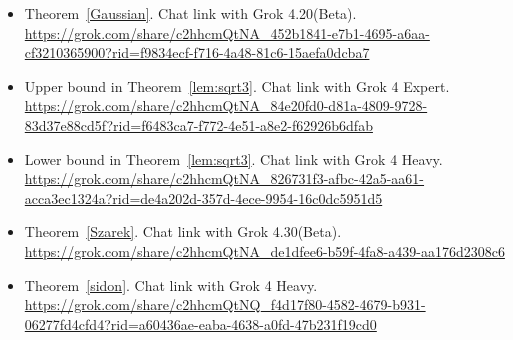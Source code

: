 \documentclass[11pt]{article}
\begin{document}
\begin{itemize}
    \item Theorem~\ref{Gaussian}. Chat link with Grok 4.20(Beta). \\
\url{https://grok.com/share/c2hhcmQtNA_452b1841-e7b1-4695-a6aa-cf3210365900?rid=f9834ecf-f716-4a48-81c6-15aefa0dcba7} \\

    \item Upper bound in Theorem~\ref{lem:sqrt3}. Chat link with Grok 4 Expert. \\
    \url{https://grok.com/share/c2hhcmQtNA_84e20fd0-d81a-4809-9728-83d37e88cd5f?rid=f6483ca7-f772-4e51-a8e2-f62926b6dfab}\\

    \item Lower bound in Theorem~\ref{lem:sqrt3}. Chat link with Grok 4 Heavy. \\
    \url{https://grok.com/share/c2hhcmQtNA_826731f3-afbc-42a5-aa61-acca3ec1324a?rid=de4a202d-357d-4ece-9954-16c0dc5951d5}\\

    \item Theorem~\ref{Szarek}. Chat link with Grok 4.30(Beta).\\
    \url{https://grok.com/share/c2hhcmQtNA_de1dfee6-b59f-4fa8-a439-aa176d2308c6}\\

    \item Theorem~\ref{sidon}. Chat link with Grok 4 Heavy.\\
    \url{https://grok.com/share/c2hhcmQtNQ_f4d17f80-4582-4679-b931-06277fd4cfd4?rid=a60436ae-eaba-4638-a0fd-47b231f19cd0}

\end{itemize}



 
\end{document}

